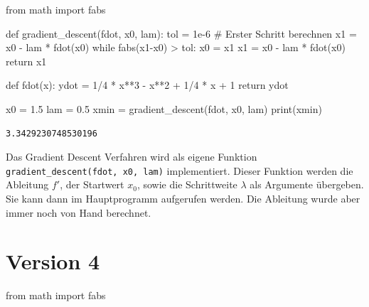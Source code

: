 \documentclass[
  a4paper,
  DIV=11]{scrreprt}
\newenvironment{Shaded}{\begin{snugshade}}{\end{snugshade}}
\newcommand{\BuiltInTok}[1]{\textcolor[rgb]{0.00,0.23,0.31}{#1}}
\newcommand{\CommentTok}[1]{\textcolor[rgb]{0.37,0.37,0.37}{#1}}
\newcommand{\ControlFlowTok}[1]{\textcolor[rgb]{0.00,0.23,0.31}{#1}}
\newcommand{\DecValTok}[1]{\textcolor[rgb]{0.68,0.00,0.00}{#1}}
\newcommand{\FloatTok}[1]{\textcolor[rgb]{0.68,0.00,0.00}{#1}}
\newcommand{\ImportTok}[1]{\textcolor[rgb]{0.00,0.46,0.62}{#1}}
\newcommand{\KeywordTok}[1]{\textcolor[rgb]{0.00,0.23,0.31}{#1}}
\newcommand{\NormalTok}[1]{\textcolor[rgb]{0.00,0.23,0.31}{#1}}
\newcommand{\OperatorTok}[1]{\textcolor[rgb]{0.37,0.37,0.37}{#1}}
\theoremstyle{definition}
\theoremstyle{definition}
\theoremstyle{remark}
\begin{document}
\begin{tcolorbox}
\begin{Shaded}
\begin{Highlighting}[]
\ImportTok{from}\NormalTok{ math }\ImportTok{import}\NormalTok{ fabs}

\KeywordTok{def}\NormalTok{ gradient\_descent(fdot, x0, lam):}
\NormalTok{    tol }\OperatorTok{=} \FloatTok{1e{-}6}
    \CommentTok{\# Erster Schritt berechnen}
\NormalTok{    x1 }\OperatorTok{=}\NormalTok{ x0 }\OperatorTok{{-}}\NormalTok{ lam }\OperatorTok{*}\NormalTok{ fdot(x0)}
    \ControlFlowTok{while}\NormalTok{ fabs(x1}\OperatorTok{{-}}\NormalTok{x0) }\OperatorTok{\textgreater{}}\NormalTok{ tol:}
\NormalTok{        x0 }\OperatorTok{=}\NormalTok{ x1}
\NormalTok{        x1 }\OperatorTok{=}\NormalTok{ x0 }\OperatorTok{{-}}\NormalTok{ lam }\OperatorTok{*}\NormalTok{ fdot(x0)}
    \ControlFlowTok{return}\NormalTok{ x1}

\KeywordTok{def}\NormalTok{ fdot(x):}
\NormalTok{    ydot }\OperatorTok{=} \DecValTok{1}\OperatorTok{/}\DecValTok{4} \OperatorTok{*}\NormalTok{ x}\OperatorTok{**}\DecValTok{3} \OperatorTok{{-}}\NormalTok{ x}\OperatorTok{**}\DecValTok{2} \OperatorTok{+} \DecValTok{1}\OperatorTok{/}\DecValTok{4} \OperatorTok{*}\NormalTok{ x }\OperatorTok{+} \DecValTok{1}
    \ControlFlowTok{return}\NormalTok{ ydot}

\NormalTok{x0 }\OperatorTok{=} \FloatTok{1.5}
\NormalTok{lam }\OperatorTok{=} \FloatTok{0.5}
\NormalTok{xmin }\OperatorTok{=}\NormalTok{ gradient\_descent(fdot, x0, lam)}
\BuiltInTok{print}\NormalTok{(xmin)}
\end{Highlighting}
\end{Shaded}

\begin{verbatim}
3.3429230748530196
\end{verbatim}

Das Gradient Descent Verfahren wird als eigene Funktion
\texttt{gradient\_descent(fdot,\ x0,\ lam)} implementiert. Dieser
Funktion werden die Ableitung \(f'\), der Startwert \(x_0\), sowie die
Schrittweite \(\lambda\) als Argumente übergeben. Sie kann dann im
Hauptprogramm aufgerufen werden. Die Ableitung wurde aber immer noch von
Hand berechnet.

\section{Version 4}

\begin{Shaded}
\begin{Highlighting}[]
\ImportTok{from}\NormalTok{ math }\ImportTok{import}\NormalTok{ fabs}


\end{Highlighting}
\end{Shaded}
\end{tcolorbox}
\end{document}
